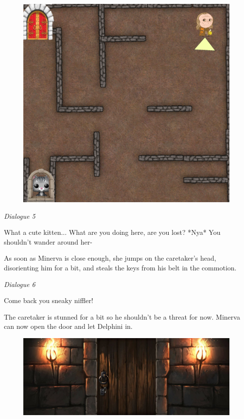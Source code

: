 \begin{figure}[H]
\includegraphics[max width=\textwidth]{../Pictures/Level/Script/Map_door_close_picture.png}
\end{figure}

\textit{Dialogue 5} 
\begin{dialogue}
 What a cute kitten... What are you doing here, are you lost?
 *Nya*
 You shouldn't wander around her-
\end{dialogue} 


As soon as Minerva is close enough, she jumps on the caretaker's head, disorienting him for a bit, and steals the keys from his belt in the commotion.

\pagebreak

\textit{Dialogue 6}          
\begin{dialogue}
 Come back you sneaky niffler!
\end{dialogue} 

The caretaker is stunned for a bit so he shouldn't be a threat for now. Minerva can now open the door and let Delphini in.

\begin{figure}[H]
\includegraphics[max width=\textwidth]{../Pictures/Level/Script/Door_key_picture.png}
\end{figure}


